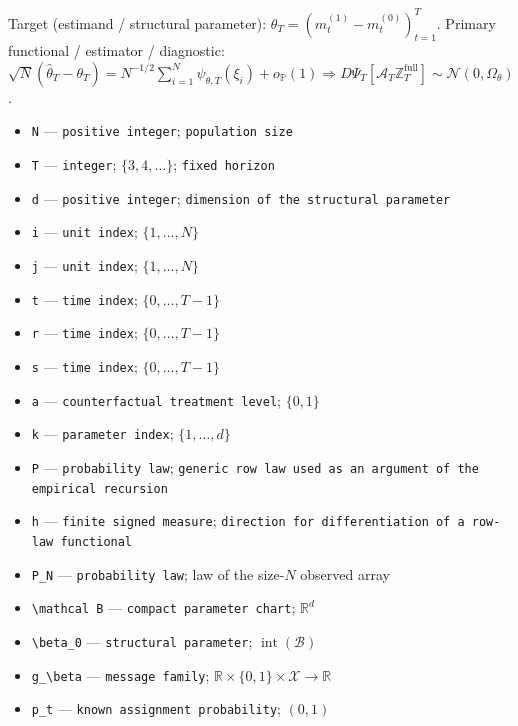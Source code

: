 \documentclass{article}
\begin{document}
Target (estimand / structural parameter): \(\theta_T=(m_t^{(1)}-m_t^{(0)})_{t=1}^T\).
Primary functional / estimator / diagnostic: \(\sqrt N(\widehat\theta_T-\theta_T)=N^{-1/2}\sum_{i=1}^N\psi_{\theta,T}(\xi_i)+o_{\mathbb P}(1)\Rightarrow D\Psi_T[\mathcal A_T\mathbb Z_T^{\mathrm{full}}]\sim\mathcal N(0,\Omega_\theta)\).
\begin{itemize}
  \item \texttt{N} --- \texttt{positive integer}; \texttt{population size}
  \item \texttt{T} --- \texttt{integer}; \(\{3,4,\ldots\}\); \texttt{fixed horizon}
  \item \texttt{d} --- \texttt{positive integer}; \texttt{dimension of the structural parameter}
  \item \texttt{i} --- \texttt{unit index}; \(\{1,\ldots,N\}\)
  \item \texttt{j} --- \texttt{unit index}; \(\{1,\ldots,N\}\)
  \item \texttt{t} --- \texttt{time index}; \(\{0,\ldots,T-1\}\)
  \item \texttt{r} --- \texttt{time index}; \(\{0,\ldots,T-1\}\)
  \item \texttt{s} --- \texttt{time index}; \(\{0,\ldots,T-1\}\)
  \item \texttt{a} --- \texttt{counterfactual treatment level}; \(\{0,1\}\)
  \item \texttt{k} --- \texttt{parameter index}; \(\{1,\ldots,d\}\)
  \item \texttt{P} --- \texttt{probability law}; \texttt{generic row law used as an argument of the empirical recursion}
  \item \texttt{h} --- \texttt{finite signed measure}; \texttt{direction for differentiation of a row-\allowbreak{}law functional}
  \item \texttt{P\_\allowbreak{}N} --- \texttt{probability law}; law of the size-\(N\) observed array
  \item \texttt{\textbackslash{}\allowbreak{}mathcal B} --- \texttt{compact parameter chart}; \(\mathbb R^d\)
  \item \texttt{\textbackslash{}\allowbreak{}beta\_\allowbreak{}0} --- \texttt{structural parameter}; \(\operatorname{int}(\mathcal B)\)
  \item \texttt{g\_\allowbreak{}\textbackslash{}\allowbreak{}beta} --- \texttt{message family}; \(\mathbb R\times\{0,1\}\times\mathcal X\to\mathbb R\)
  \item \texttt{p\_\allowbreak{}t} --- \texttt{known assignment probability}; \((0,1)\)

\end{itemize}
\end{document}
